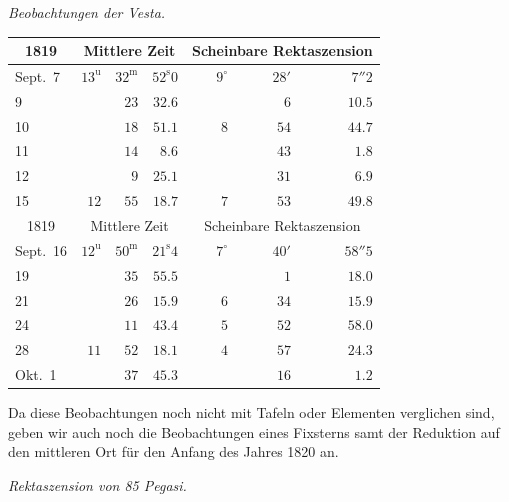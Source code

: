 \emph{Beobachtungen der Vesta.}

\begin{center}
\begin{tabular}{l|rrr|rrr}
\multicolumn{1}{c|}{1819}  &  \multicolumn{3}{c|}{Mittlere Zeit}  &  \multicolumn{3}{c}{Scheinbare Rektaszension}  \\
\hline
Sept.\ 7  &  $13^{\mathrm u}$  &  $32^{\mathrm m}$  &  $52^{\mathrm s}0$  &  $9^\circ$  &  $28'$  &  $7''2$  \\
9  &   &  $23$  &  $32.6$  &   &  $6$  &  $10.5$  \\
10  &   &  $18$  &  $51.1$  &  $8$  &  $54$  &  $44.7$  \\
11  &   &  $14$  &  $8.6$  &   &  $43$  &  $1.8$  \\
12  &   &  $9$  &  $25.1$  &   &  $31$  &  $6.9$  \\
15  &  $12$  &  $55$  &  $18.7$  &  $7$  &  $53$  &  $49.8$  \\
\hline
 \multicolumn{1}{c|}{1819}  &  \multicolumn{3}{c|}{Mittlere Zeit}  &  \multicolumn{3}{c}{Scheinbare Rektaszension}  \\
\hline
 Sept.\ 16  &  $12^{\mathrm u}$  &  $50^{\mathrm m}$  &  $21^{\mathrm s}4$  &  $7^\circ$  &  $40'$  &  $58''5$  \\
 19  &   &  $35$  &  $55.5$  &   &  $1$  &  $18.0$  \\
 21  &   &  $26$  &  $15.9$  &  $6$  &  $34$  &  $15.9$  \\
 24  &   &  $11$  &  $43.4$  &  $5$  &  $52$  &  $58.0$  \\
 28  &  $11$  &  $52$  &  $18.1$  &  $4$  &  $57$  &  $24.3$  \\
 Okt.\ 1  &   &  $37$  &  $45.3$  &   &  $16$  &  $1.2$  \\
\end{tabular}
\end{center}

\par\indent Da diese Beobachtungen noch nicht mit Tafeln oder Elementen verglichen sind, geben wir auch noch die Beobachtungen eines Fixsterns samt der Reduktion auf den mittleren Ort für den Anfang des Jahres 1820 an.


\begin{center}
\emph{Rektaszension von 85 Pegasi.}
\end{center}

